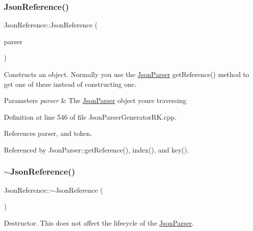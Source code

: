 \subsubsection{\texorpdfstring{Json\+Reference()}{JsonReference()}\hspace{0.1cm}{\footnotesize\ttfamily [1/2]}}
{\footnotesize\ttfamily Json\+Reference\+::\+Json\+Reference (\begin{DoxyParamCaption}\item[{const \hyperlink{class_json_parser}{Json\+Parser} $\ast$}]{parser }\end{DoxyParamCaption})}



Constructs an object. Normally you use the \hyperlink{class_json_parser}{Json\+Parser} get\+Reference() method to get one of these instead of constructing one. 


\begin{DoxyParams}{Parameters}
{\em parser} & The \hyperlink{class_json_parser}{Json\+Parser} object you\textquotesingle{}re traversing \\
\hline
\end{DoxyParams}


Definition at line 546 of file Json\+Parser\+Generator\+R\+K.\+cpp.



References parser, and token.



Referenced by Json\+Parser\+::get\+Reference(), index(), and key().

\mbox{\label{class_json_reference_a4aca0aedf85a69c53d3af71baaee5030}} 
\subsubsection{\texorpdfstring{$\sim$\+Json\+Reference()}{~JsonReference()}}
{\footnotesize\ttfamily Json\+Reference\+::$\sim$\+Json\+Reference (\begin{DoxyParamCaption}{ }\end{DoxyParamCaption})\hspace{0.3cm}{\ttfamily [virtual]}}



Destructor. This does not affect the lifecycle of the \hyperlink{class_json_parser}{Json\+Parser}. 



